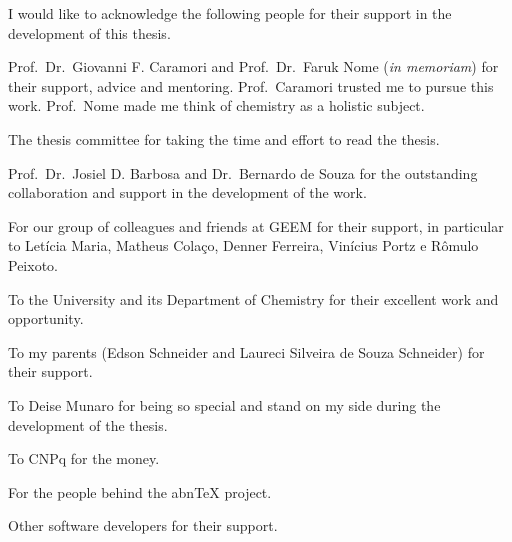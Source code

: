 \begin{agradecimentos}[Acknowledgements]
I would like to acknowledge the following people for their support in the
development of this thesis.

Prof.\ Dr.\ Giovanni F. Caramori and
Prof.\ Dr.\ Faruk Nome (\emph{in memoriam})
for their support, advice and mentoring.
Prof.\ Caramori trusted me to pursue this work.
Prof.\ Nome made me think of chemistry as a holistic subject.

The thesis committee for taking the time and effort to read the thesis.

Prof.\ Dr.\ Josiel D. Barbosa and
Dr.\ Bernardo de Souza
for the outstanding collaboration and support in the development of the work.

For our group of colleagues and friends at GEEM for their support, in particular to
Letícia Maria, Matheus Colaço, Denner Ferreira, Vinícius Portz e Rômulo Peixoto.

To the University and its Department of Chemistry
for their excellent work and opportunity.

To my parents (Edson Schneider and Laureci Silveira de Souza Schneider)
for their support.

To Deise Munaro for being so special
and stand on my side during the development of the thesis.

To CNPq for the money.

For the people behind the abn\TeX{} project.

Other software developers for their support.

\end{agradecimentos}
